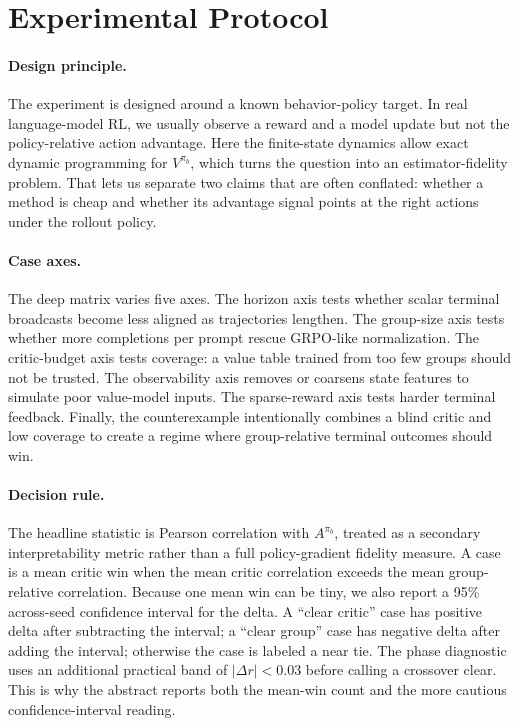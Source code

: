 \documentclass[11pt]{article}
\newcommand{\grpo}{\textsc{GRPO}}
\begin{document}
\section{Experimental Protocol}

\paragraph{Design principle.}
The experiment is designed around a known behavior-policy target. In real
language-model RL, we usually observe a reward and a model update but not the
policy-relative action advantage. Here the finite-state dynamics allow exact
dynamic programming for $V^{\pi_b}$, which turns the question into an
estimator-fidelity problem. That lets us separate two claims that are often
conflated: whether a method is cheap and whether its advantage signal points at
the right actions under the rollout policy.

\paragraph{Case axes.}
The deep matrix varies five axes. The horizon axis tests whether scalar
terminal broadcasts become less aligned as trajectories lengthen. The group-size
axis tests whether more completions per prompt rescue \grpo-like normalization.
The critic-budget axis tests coverage: a value table trained from too few
groups should not be trusted. The observability axis removes or coarsens state
features to simulate poor value-model inputs. The sparse-reward axis tests
harder terminal feedback. Finally, the counterexample intentionally combines a
blind critic and low coverage to create a regime where group-relative terminal
outcomes should win.

\paragraph{Decision rule.}
The headline statistic is Pearson correlation with $A^{\pi_b}$, treated as a
secondary interpretability metric rather than a full policy-gradient fidelity
measure. A case is a mean critic win when the mean critic correlation exceeds
the mean group-relative correlation. Because one mean win can be tiny, we also
report a 95\% across-seed confidence interval for the delta. A ``clear critic''
case has positive delta after subtracting the interval; a ``clear group'' case
has negative delta after adding the interval; otherwise the case is labeled a
near tie. The phase diagnostic uses an additional practical band of
$|\Delta r|<0.03$ before calling a crossover clear. This is why the abstract
reports both the mean-win count and the more cautious confidence-interval
reading.
\end{document}

